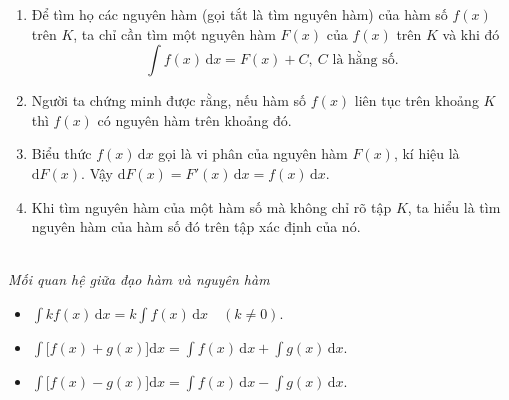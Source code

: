 \begin{chuy}
\begin{minipage}[c]{.64\linewidth}
\begin{enumerate}[label=\alph*)]
  \item Để tìm họ các nguyên hàm (gọi tắt là tìm nguyên hàm) của hàm số $f(x)$ trên $K$, ta chỉ cần tìm một nguyên hàm $F(x)$ của $f(x)$ trên $K$ và khi đó
  \[\int f(x)\,\mathrm dx=F(x)+C,\ C\text{ là hằng số}.\]
  \item Người ta chứng minh được rằng, nếu hàm số $f(x)$ liên tục trên khoảng $K$ thì $f(x)$ có nguyên hàm trên khoảng đó.
  \item Biểu thức $f(x)\,\mathrm dx$ gọi là vi phân của nguyên hàm $F(x)$, kí hiệu là $\mathrm dF(x)$. Vậy $\mathrm dF(x)=F'(x)\,\mathrm dx=f(x)\,\mathrm dx$.
  \item Khi tìm nguyên hàm của một hàm số mà không chỉ rõ tập $K$, ta hiểu là tìm nguyên hàm của hàm số đó trên tập xác định của nó.
\end{enumerate}
\end{minipage}\hfill
\begin{minipage}[c]{.33\linewidth}\centering
{}\\[2pt]
{\scriptsize\itshape\color{dcxam}Mối quan hệ giữa đạo hàm và nguyên hàm}
\end{minipage}
\end{chuy}

\begin{congthuc}
\begin{itemize}
  \item $\displaystyle\int kf(x)\,\mathrm dx=k\int f(x)\,\mathrm dx\quad(k\ne0)$.
  \item $\displaystyle\int\big[f(x)+g(x)\big]\mathrm dx=\int f(x)\,\mathrm dx+\int g(x)\,\mathrm dx$.
  \item $\displaystyle\int\big[f(x)-g(x)\big]\mathrm dx=\int f(x)\,\mathrm dx-\int g(x)\,\mathrm dx$.
\end{itemize}
\end{congthuc}

